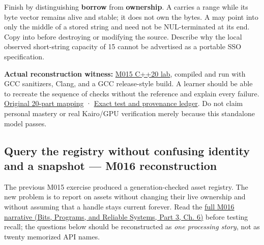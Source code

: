 Finish by distinguishing \textbf{borrow} from \textbf{ownership}. A  carries a range while its byte vector remains alive and stable; it does not own the bytes. A  may point into only the middle of a stored string and need not be NUL-terminated at its end. Copy  into  before destroying or modifying the source. Describe why the local observed short-string capacity of 15 cannot be advertised as a portable SSO specification.

\textbf{Actual reconstruction witness:} \hyperref[source-file-e829cf731b17419e282775cf]{M015 C++20 lab}, compiled and run with GCC sanitizers, Clang, and a GCC release-style build. A learner should be able to recreate the sequence of checks without the reference and explain every failure. \hyperref[appendix-fd090d982a15-m015-parts-231250-growing-the-asset-registry-without-losing-identities]{Original 20-part mapping} · \hyperref[appendix-a103e7846d21-phase-5-additive-reconstruction-m015-parts-231250]{Exact test and provenance ledger}. Do not claim personal mastery or real Kairo/GPU verification merely because this standalone model passes.

\subsection{Query the registry without confusing identity and a snapshot --- M016 reconstruction}\label{appendix-960160274237-query-the-registry-without-confusing-identity-and-a-snapshot-m016-reconstruction}

\hypertarget{appendix-960160274237-query-the-registry-without-confusing-identity-and-a-snapshot-m016-reconstruction}{}

The previous M015 exercise produced a generation-checked asset registry. The new problem is to report on assets without changing their live ownership and without assuming that a handle stays current forever. Read the \href{../01-Bits-Programs-and-Reliable-Systems-P03/main.pdf\#nameddest=01-foundations-i-ch006-from-a-living-asset-registry-to-reliable-queries-and-transformations}{full M016 narrative (Bits, Programs, and Reliable Systems, Part 3, Ch. 6)} before testing recall; the questions below should be reconstructed as \emph{one processing story}, not as twenty memorized API names.


